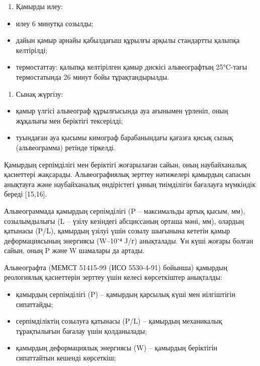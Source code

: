 {{\begin{enumerate}
\def\labelenumi{\arabic{enumi}.}
\setcounter{enumi}{1}
\item
  Қамырды илеу:
\end{enumerate}

\begin{itemize}
\item
  илеу 6 минутқа созылды;
\item
  дайын қамыр арнайы қабылдағыш құрылғы арқылы стандартты қалыпқа
  келтірілді;
\item
  термостаттау: қалыпқа келтірілген қамыр дискісі альвеографтың
  25°C-тағы термостатында 26 минут бойы тұрақтандырылды.
\end{itemize}

\begin{enumerate}
\def\labelenumi{\arabic{enumi}.}
\setcounter{enumi}{2}
\item
  Сынақ жүргізу:
\end{enumerate}

\begin{itemize}
\item
  қамыр үлгісі альвеограф құрылғысында ауа ағынымен үрленіп, оның
  жұқалығы мен беріктігі тексерілді;
\item
  туындаған ауа қысымы кимограф барабанындағы қағазға қисық сызық
  (альвеограмма) ретінде тіркелді.
\end{itemize}

Қамырдың серпімділігі мен беріктігі жоғарылаған сайын, оның
наубайханалық қасиеттері жақсарады. Альвеографиялық зерттеу нәтижелері
қамырдың сапасын анықтауға және наубайханалық өндірістегі ұнның
тиімділігін бағалауға мүмкіндік береді {[}15,16{]}.

Альвеограммада қамырдың серпімділігі (P -- максимальды артық қысым, мм),
созылымдылығы (L -- үзілу кезіндегі абсциссаның орташа мәні, мм),
олардың қатынасы (P/L), қамырдың үзілуі үшін созылу шығынына кететін
қамыр деформациясының энергиясы (W--10⁻⁴ J/г) анықталады. Ұн күші жоғары
болған сайын, оның P және W шамалары да артады.

Альвеографта (МЕМСТ 51415-99 (ИСО 5530-4-91) бойынша) қамырдың
реологиялық қасиеттерін зерттеу үшін келесі көрсеткіштер анықталды:

\begin{itemize}
\item
  қамырдың серпімділігі (P) -- қамырдың қарсылық күші мен иілгіштігін
  сипаттайды;
\item
  серпімділіктің созылуға қатынасы (P/L) -- қамырдың механикалық
  тұрақтылығын бағалау үшін қолданылады;
\item
  қамырдың деформациялық энергиясы (W) -- қамырдың беріктігін
  сипаттайтын кешенді көрсеткіш;
\end{itemize}

}}
